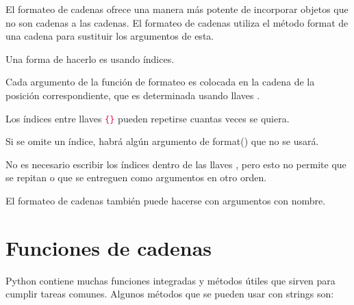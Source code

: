 \documentclass{report}
\newcommand{\ttt}[1]{
  \textcolor{Crimson}{\texttt{#1}}
}
\begin{document}
El formateo de cadenas ofrece una manera más potente de incorporar objetos que no son cadenas a las cadenas. El formateo de cadenas utiliza el método format de una cadena para sustituir los argumentos de esta.\smallskip

Una forma de hacerlo es usando índices.


Cada argumento de la función de formateo es colocada en la cadena de la posición correspondiente, que es determinada usando llaves {}.\smallskip

Los índices entre llaves \ttt{\{\}} pueden repetirse cuantas veces se quiera.


Si se omite un índice, habrá algún argumento de format() que no se usará.


No es necesario escribir los índices dentro de las llaves {}, pero esto no permite que se repitan o que se entreguen como argumentos en otro orden.


El formateo de cadenas también puede hacerse con argumentos con nombre.


\section{Funciones de cadenas}

Python contiene muchas funciones integradas y métodos útiles que sirven para cumplir tareas comunes. Algunos métodos que se pueden usar con strings son:
\end{document}
